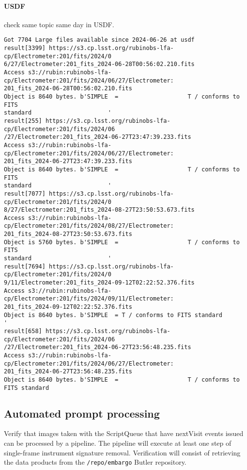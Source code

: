 \paragraph{USDF} check same topic same day in USDF.
\begin{lstlisting}
Got 7704 Large files available since 2024-06-26 at usdf
result[3399] https://s3.cp.lsst.org/rubinobs-lfa-cp/Electrometer:201/fits/2024/0
6/27/Electrometer:201_fits_2024-06-28T00:56:02.210.fits
Access s3://rubin:rubinobs-lfa-cp/Electrometer:201/fits/2024/06/27/Electrometer:
201_fits_2024-06-28T00:56:02.210.fits
Object is 8640 bytes. b'SIMPLE  =                    T / conforms to FITS
standard                      '
result[255] https://s3.cp.lsst.org/rubinobs-lfa-cp/Electrometer:201/fits/2024/06
/27/Electrometer:201_fits_2024-06-27T23:47:39.233.fits
Access s3://rubin:rubinobs-lfa-cp/Electrometer:201/fits/2024/06/27/Electrometer:
201_fits_2024-06-27T23:47:39.233.fits
Object is 8640 bytes. b'SIMPLE  =                    T / conforms to FITS
standard                      '
result[7077] https://s3.cp.lsst.org/rubinobs-lfa-cp/Electrometer:201/fits/2024/0
8/27/Electrometer:201_fits_2024-08-27T23:50:53.673.fits
Access s3://rubin:rubinobs-lfa-cp/Electrometer:201/fits/2024/08/27/Electrometer:
201_fits_2024-08-27T23:50:53.673.fits
Object is 5760 bytes. b'SIMPLE  =                    T / conforms to FITS
standard                      '
result[7694] https://s3.cp.lsst.org/rubinobs-lfa-cp/Electrometer:201/fits/2024/0
9/11/Electrometer:201_fits_2024-09-12T02:22:52.376.fits
Access s3://rubin:rubinobs-lfa-cp/Electrometer:201/fits/2024/09/11/Electrometer:
201_fits_2024-09-12T02:22:52.376.fits
Object is 8640 bytes. b'SIMPLE  = T / conforms to FITS standard                      '
result[658] https://s3.cp.lsst.org/rubinobs-lfa-cp/Electrometer:201/fits/2024/06
/27/Electrometer:201_fits_2024-06-27T23:56:48.235.fits
Access s3://rubin:rubinobs-lfa-cp/Electrometer:201/fits/2024/06/27/Electrometer:
201_fits_2024-06-27T23:56:48.235.fits
Object is 8640 bytes. b'SIMPLE  =                    T / conforms to FITS standard
\end{lstlisting}

\subsection{Automated prompt processing}
Verify that images taken with the ScriptQueue that have nextVisit events issued can be processed by a pipeline.
The pipeline will execute at least one step of single-frame instrument signature removal.
Verification will consist of retrieving the data products from the \texttt{/repo/embargo} Butler repository.


